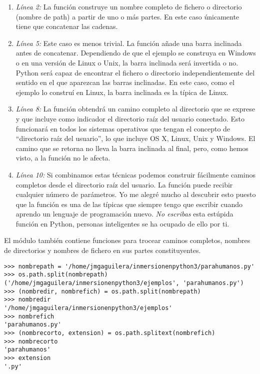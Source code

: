 \begin{enumerate}

\item \emph{Línea 2:} La función  construye un nombre completo de fichero o directorio (nombre de path) a partir de uno o más partes. En este caso únicamente tiene que concatenar las cadenas.

\item \emph{Línea 5:} Este caso es menos trivial. La función añade una barra inclinada antes de concatenar. Dependiendo de que el ejemplo se construya en Windows o en una versión de Linux o Unix, la barra inclinada será invertida o no. Python será capaz de encontrar el fichero o directorio independientemente del sentido en el que aparezcan las barras inclinadas. En este caso, como el ejemplo lo construí en Linux, la barra inclinada es la típica de Linux.

\item \emph{Línea 8:} La función  obtendrá un camino completo al directorio que se exprese y que incluye \codigo{~} como indicador el directorio raíz del usuario conectado. Esto funcionará en todos los sistemas operativos que tengan el concepto de ``directorio raíz del usuario'', lo que incluye OS X, Linux, Unix y Windows. El camino que se retorna no lleva la barra inclinada al final, pero, como hemos visto, a la función  no le afecta.

\item \emph{Línea 10:} Si combinamos estas técnicas podemos construir fácilmente caminos completos desde el directorio raíz del usuario. La función  puede recibir cualquier número de parámetros. Yo me alegré mucho al descubrir esto puesto que la función  es una de las típicas que siempre tengo que escribir cuando aprendo un lenguaje de programación nuevo. \emph{No escribas} esta estúpida función en Python, personas inteligentes se ha ocupado de ello por ti.

\end{enumerate}

El módulo  también contiene funciones para trocear caminos completos, nombres de directorios y nombres de fichero en sus partes constituyentes.

\noindent\begin{minipage}{\textwidth}
\begin{lstlisting}[mathescape=True]
>>> nombrepath = '/home/jmgaguilera/inmersionenpython3/parahumanos.py'
>>> os.path.split(nombrepath)
('/home/jmgaguilera/inmersionenpython3/ejemplos', 'parahumanos.py')
>>> (nombredir, nombrefich) = os.path.split(nombrepath)
>>> nombredir
'/home/jmgaguilera/inmersionenpython3/ejemplos'
>>> nombrefich
'parahumanos.py'
>>> (nombrecorto, extension) = os.path.splitext(nombrefich)
>>> nombrecorto
'parahumanos'
>>> extension
'.py'
\end{lstlisting}
\end{minipage}


